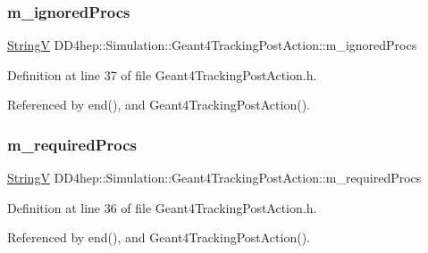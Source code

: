 \subsubsection{\texorpdfstring{m\+\_\+ignored\+Procs}{m\_ignoredProcs}}
{\footnotesize\ttfamily \hyperlink{class_d_d4hep_1_1_simulation_1_1_geant4_tracking_post_action_ae14809326747530052282a63ea5a362d}{StringV} D\+D4hep\+::\+Simulation\+::\+Geant4\+Tracking\+Post\+Action\+::m\+\_\+ignored\+Procs\hspace{0.3cm}{\ttfamily [protected]}}



Definition at line 37 of file Geant4\+Tracking\+Post\+Action.\+h.



Referenced by end(), and Geant4\+Tracking\+Post\+Action().

\hypertarget{class_d_d4hep_1_1_simulation_1_1_geant4_tracking_post_action_a1194a1813aee919384ae90d6672d98c5}{}\label{class_d_d4hep_1_1_simulation_1_1_geant4_tracking_post_action_a1194a1813aee919384ae90d6672d98c5} 
\subsubsection{\texorpdfstring{m\+\_\+required\+Procs}{m\_requiredProcs}}
{\footnotesize\ttfamily \hyperlink{class_d_d4hep_1_1_simulation_1_1_geant4_tracking_post_action_ae14809326747530052282a63ea5a362d}{StringV} D\+D4hep\+::\+Simulation\+::\+Geant4\+Tracking\+Post\+Action\+::m\+\_\+required\+Procs\hspace{0.3cm}{\ttfamily [protected]}}



Definition at line 36 of file Geant4\+Tracking\+Post\+Action.\+h.



Referenced by end(), and Geant4\+Tracking\+Post\+Action().

\hypertarget{class_d_d4hep_1_1_simulation_1_1_geant4_tracking_post_action_a917619b10aa1e34636fb7fe49ad5575e}{}\label{class_d_d4hep_1_1_simulation_1_1_geant4_tracking_post_action_a917619b10aa1e34636fb7fe49ad5575e} 
